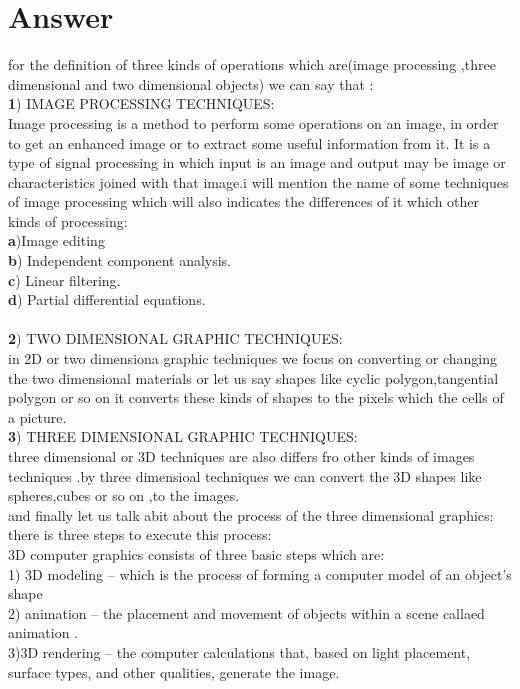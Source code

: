 \documentclass{article}
\begin{document}
\section{Answer}
for the definition of three kinds of operations which are(image processing ,three dimensional and two dimensional objects) we can say that :
\\\textbf{1}) IMAGE PROCESSING TECHNIQUES:
\\Image processing is a method to perform  some operations on an image, in order to get an enhanced image or to extract some useful information from it. It is a type of signal processing in which input is an image and output may be image or characteristics joined with that image.i will mention the name of some techniques of image processing which will also indicates the differences of it which other kinds of processing:
\\\textbf{a})Image editing
\\\textbf{b}) Independent component analysis.
\\\textbf{c}) Linear filtering.
\\\textbf{d}) Partial differential equations.
\\
\\\textbf{2}) TWO DIMENSIONAL GRAPHIC TECHNIQUES:
\\in 2D or two dimensiona graphic techniques we focus on converting or changing the two dimensional materials or let us say shapes like cyclic polygon,tangential polygon or so on  it converts these kinds of shapes to the pixels which the cells of a picture.
\\\textbf{3}) THREE DIMENSIONAL GRAPHIC TECHNIQUES:
\\ three dimensional or 3D techniques are also differs fro other kinds of images techniques .by three dimensioal techniques we can convert the 3D shapes like spheres,cubes or so on ,to the images. 
\\ and finally let us talk abit about the process of the three dimensional graphics:
\\ there is three steps to execute this process:
\\ 3D computer graphics consists of  three basic steps which are:
\\ 1) 3D modeling –  which is the process of forming a computer model of an object's shape
\\2) animation – the placement and movement of objects within a scene callaed animation .
\\3)3D rendering – the computer calculations that, based on light placement, surface types, and other qualities, generate the image.
\end{document}
